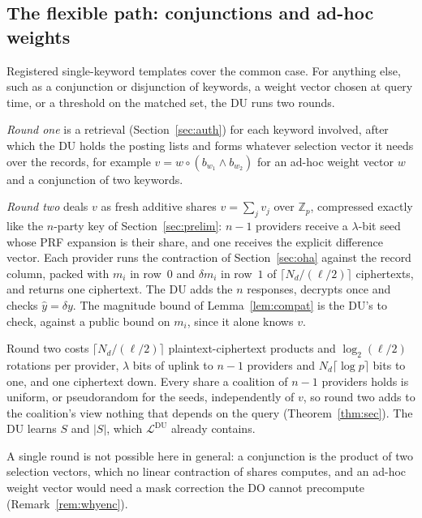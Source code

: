 \documentclass[a4paper,fleqn]{cas-sc}
\newcommand{\Leak}{\mathcal{L}}
\begin{document}
\subsection{The flexible path: conjunctions and ad-hoc weights}
\label{sec:flex}
Registered single-keyword templates cover the common case. For anything else,
such as a conjunction or disjunction of keywords, a weight vector chosen at
query time, or a threshold on the matched set, the DU runs two rounds.

\emph{Round one} is a retrieval (Section~\ref{sec:auth}) for each keyword
involved, after which the DU holds the posting lists and forms whatever
selection vector it needs over the records, for example
$v=w\circ(b_{w_1}\wedge b_{w_2})$ for an ad-hoc weight vector $w$ and a
conjunction of two keywords.

\emph{Round two} deals $v$ as fresh additive shares $v=\sum_jv_j$ over
$\mathbb{Z}_p$, compressed exactly like the $n$-party key of
Section~\ref{sec:prelim}: $n-1$ providers receive a $\lambda$-bit seed whose
PRF expansion is their share, and one receives the explicit difference vector.
Each provider runs the contraction of Section~\ref{sec:oha} against the record
column, packed with $m_i$ in row~$0$ and $\delta m_i$ in row~$1$ of
$\lceil N_d/(\ell/2)\rceil$ ciphertexts, and returns one ciphertext. The DU
adds the $n$ responses, decrypts once and checks $\hat y=\delta y$. The
magnitude bound of Lemma~\ref{lem:compat} is the DU's to check, against a
public bound on $m_i$, since it alone knows $v$.

Round two costs $\lceil N_d/(\ell/2)\rceil$ plaintext-ciphertext products and
$\log_2(\ell/2)$ rotations per provider, $\lambda$ bits of uplink to $n-1$
providers and $N_d\lceil\log p\rceil$ bits to one, and one ciphertext down.
Every share a coalition of $n-1$ providers holds is uniform, or pseudorandom
for the seeds, independently of $v$, so round two adds to the coalition's view
nothing that depends on the query (Theorem~\ref{thm:sec}). The DU learns $S$
and $|S|$, which $\Leak^{\text{DU}}$ already contains.

A single round is not possible here in general: a conjunction is the product
of two selection vectors, which no linear contraction of shares computes, and
an ad-hoc weight vector would need a mask correction the DO cannot precompute
(Remark~\ref{rem:whyenc}).
\end{document}
